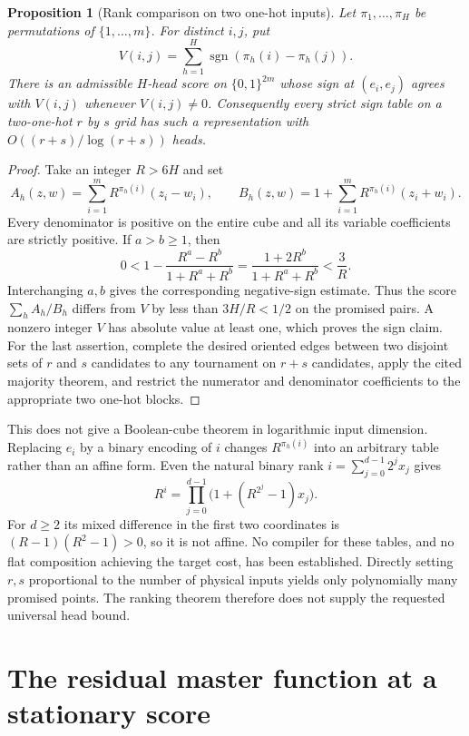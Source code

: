 \documentclass[11pt]{article}
\newtheorem{proposition}{Proposition}
\begin{document}
\begin{proposition}[Rank comparison on two one-hot inputs]
Let $\pi_1,\ldots,\pi_H$ be permutations of $\{1,\ldots,m\}$.
For distinct $i,j$, put
\[
 V(i,j)=\sum_{h=1}^H\operatorname{sgn}(\pi_h(i)-\pi_h(j)).
\]
There is an admissible $H$-head score on $\{0,1\}^{2m}$ whose
sign at $(e_i,e_j)$ agrees with $V(i,j)$ whenever $V(i,j)\ne0$.
Consequently every strict sign table on a two-one-hot $r$ by $s$
grid has such a representation with $O((r+s)/\log(r+s))$ heads.
\end{proposition}
\begin{proof}
Take an integer $R>6H$ and set
\[
 A_h(z,w)=\sum_{i=1}^m R^{\pi_h(i)}(z_i-w_i),\qquad
 B_h(z,w)=1+\sum_{i=1}^m R^{\pi_h(i)}(z_i+w_i).
\]
Every denominator is positive on the entire cube and all its variable
coefficients are strictly positive. If $a>b\ge1$, then
\[
 0<1-\frac{R^a-R^b}{1+R^a+R^b}
   =\frac{1+2R^b}{1+R^a+R^b}<\frac3R.
\]
Interchanging $a,b$ gives the corresponding negative-sign estimate.
Thus the score $\sum_h A_h/B_h$ differs from $V$ by less than
$3H/R<1/2$ on the promised pairs. A nonzero integer $V$ has
absolute value at least one, which proves the sign claim.
For the last assertion, complete the desired oriented edges between
two disjoint sets of $r$ and $s$ candidates to any tournament on
$r+s$ candidates, apply the cited majority theorem, and restrict
the numerator and denominator coefficients to the appropriate two
one-hot blocks.
\end{proof}

This does not give a Boolean-cube theorem in logarithmic input
dimension. Replacing $e_i$ by a binary encoding of $i$ changes
$R^{\pi_h(i)}$ into an arbitrary table rather than an affine form.
Even the natural binary rank $i=\sum_{j=0}^{d-1}2^j x_j$ gives
\[
 R^i=\prod_{j=0}^{d-1}\bigl(1+(R^{2^j}-1)x_j\bigr).
\]
For $d\ge2$ its mixed difference in the first two coordinates is
$(R-1)(R^2-1)>0$, so it is not affine. No compiler for these
tables, and no flat composition achieving the target cost, has been
established. Directly setting $r,s$ proportional to the number of
physical inputs yields only polynomially many promised points.
The ranking theorem therefore does not supply the requested universal
head bound.

\section{The residual master function at a stationary score}
\end{document}
